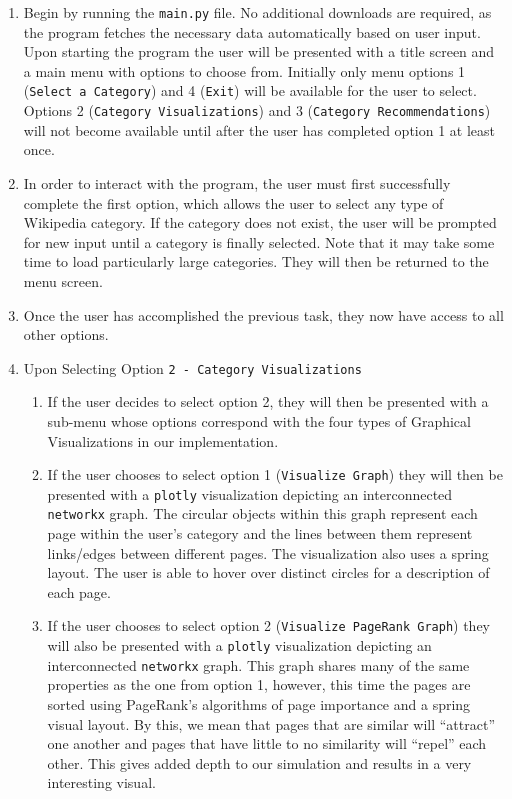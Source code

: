 \documentclass[fontsize=11pt]{article}
\begin{document}
\begin{enumerate}
    \item Begin by running the \texttt{main.py} file. No additional downloads are required, as the program fetches the necessary data automatically based on user input. Upon starting the program the user will be presented with a title screen and a main menu with options to choose from. Initially only menu options 1 (\texttt{Select a Category}) and 4 (\texttt{Exit}) will be  available for the user to select. Options 2 (\texttt{Category Visualizations}) and 3 (\texttt{Category Recommendations}) will not become available until after the user has completed option 1 at least once.
    \item In order to interact with the program, the user must first successfully complete the first option, which allows the user to select any type of Wikipedia category. If the category does not exist, the user will be prompted for new input until a category is finally selected. Note that it may take some time to load particularly large categories. They will then be returned to the menu screen.
    \item Once the user has accomplished the previous task, they now have access to all other options.
    \item Upon Selecting Option \texttt{2 - Category Visualizations} 
    \begin{enumerate}
        \item If the user decides to select option 2, they will then be presented with a sub-menu whose options correspond with the four types of Graphical Visualizations in our implementation.
        \item If the user chooses to select option 1 (\texttt{Visualize Graph}) they will then be presented with a \texttt{plotly} visualization depicting an interconnected \texttt{networkx} graph. The circular objects within this graph represent each page within the user's category and the lines between them represent links/edges between different pages. The visualization also uses a spring layout. The user is able to hover over distinct circles for a description of each page.
        \item If the user chooses to select option 2 (\texttt{Visualize PageRank Graph}) they will also be presented with a \texttt{plotly} visualization depicting an interconnected \texttt{networkx} graph. This graph shares many of the same properties as the one from option 1, however, this time the pages are sorted using PageRank's algorithms of page importance and a spring visual layout. By this, we mean that pages that are similar will ``attract'' one another and pages that have little to no similarity will ``repel'' each other. This gives added depth to our simulation and results in a very interesting visual. 
        

\end{enumerate}
\end{enumerate}
\end{document}
